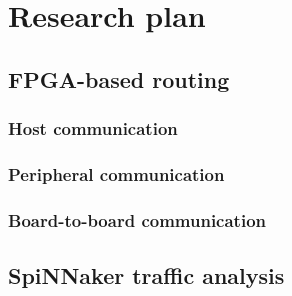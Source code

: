 \chapter{Research plan}
	\label{sec:research-plan}
	
	
	\section{FPGA-based routing}
		
		
		\subsection{Host communication}
			
		
		\subsection{Peripheral communication}
			
		
		\subsection{Board-to-board communication}
			
	
	
	\section{SpiNNaker traffic analysis}
		
	
